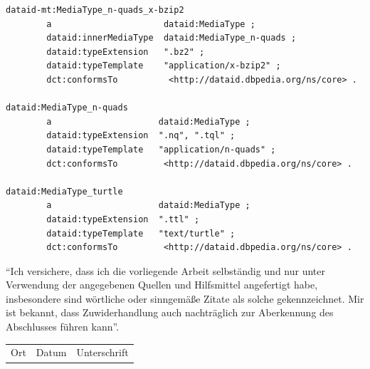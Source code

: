 \documentclass[a4paper,english,twoside,BCOR1.5cm,headsepline,DIV12,appendixprefix,final,12pt]{scrbook}
\begin{document}
\begin{lstlisting}[language=ttl, captionpos=b, label=lst:dcex,linewidth=\columnwidth,breaklines=true,basicstyle=\ttfamily\scriptsize]
dataid-mt:MediaType_n-quads_x-bzip2
        a                      dataid:MediaType ;
        dataid:innerMediaType  dataid:MediaType_n-quads ;
        dataid:typeExtension   ".bz2" ;
        dataid:typeTemplate    "application/x-bzip2" ;
        dct:conformsTo          <http://dataid.dbpedia.org/ns/core> .

dataid:MediaType_n-quads
        a                     dataid:MediaType ;
        dataid:typeExtension  ".nq", ".tql" ;
        dataid:typeTemplate   "application/n-quads" ;
        dct:conformsTo         <http://dataid.dbpedia.org/ns/core> .

dataid:MediaType_turtle
        a                     dataid:MediaType ;
        dataid:typeExtension  ".ttl" ;
        dataid:typeTemplate   "text/turtle" ;
        dct:conformsTo         <http://dataid.dbpedia.org/ns/core> .
\end{lstlisting}

\thispagestyle{empty}
"`Ich versichere, dass ich die vorliegende Arbeit selbständig und nur unter Verwendung der angegebenen Quellen und Hilfsmittel angefertigt habe, insbesondere sind wörtliche oder sinngemäße Zitate als solche gekennzeichnet. Mir ist bekannt, dass Zuwiderhandlung auch nachträglich zur Aberkennung des Abschlusses führen kann"'.

\vspace{3cm}
\begin{tabularx}{\linewidth}{X X X}
Ort & Datum	& Unterschrift\\
\end{tabularx}
\end{document}
